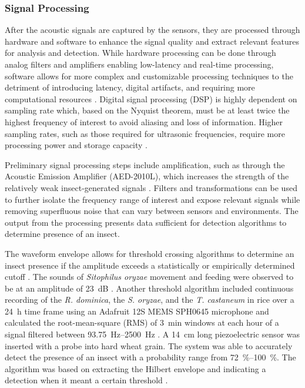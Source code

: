 \documentclass[../Vibro-Acoustic Signatures and Detection Algorithms for Stored Product Insects.tex]{subfiles}
\begin{document}
\newpage

\subsubsection{Signal Processing}

After the acoustic signals are captured by the sensors, they are processed through hardware and software to enhance the signal quality and extract relevant features for analysis and detection. While hardware processing can be done through analog filters and amplifiers enabling low-latency and real-time processing, software allows for more complex and customizable processing techniques to the detriment of introducing latency, digital artifacts, and requiring more computational resources \cite{mankinAutomatedApplicationsAcoustics2021}. Digital signal processing (DSP) is highly dependent on sampling rate which, based on the Nyquist theorem, must be at least twice the highest frequency of interest to avoid aliasing and loss of information. Higher sampling rates, such as those required for ultrasonic frequencies, require more processing power and storage capacity \cite{mankinPerspectivePromiseCentury2011}.

Preliminary signal processing steps include amplification, such as through the Acoustic Emission Amplifier (AED-2010L), which increases the strength of the relatively weak insect-generated signals \cite{eliopoulosEstimationPopulationDensity2016}. Filters and transformations can be used to further isolate the frequency range of interest and expose relevant signals while removing superfluous noise that can vary between sensors and environments. The output from the processing presents data sufficient for detection algorithms to determine presence of an insect.

The waveform envelope allows for threshold crossing algorithms to determine an insect presence if the amplitude exceeds a statistically or empirically determined cutoff \cite{mankinAutomatedApplicationsAcoustics2021}. The sounds of \textit{Sitophilus oryzae} movement and feeding were observed to be at an amplitude of \SI{23}{\deci\bel} \cite{mankinNoiseShieldingAcoustic1996}. Another threshold algorithm included continuous recording of the \textit{R. dominica}, the \textit{S. oryzae}, and the \textit{T. castaneum} in rice over a \SI{24}{\hour} time frame using an Adafruit 12S MEMS SPH0645 microphone and calculated the root-mean-square (RMS) of \SI{3}{\minute} windows at each hour of a signal filtered between \SIrange{93.75}{2500}{\hertz} \cite{balingbingDeterminingSoundSignatures2024}. A \SI{14}{\centi\meter} long piezoelectric sensor was inserted with a probe into hard wheat grain. The system was able to accurately detect the presence of an insect with a probability range from \SIrange{72}{100}{\percent}. The algorithm was based on extracting the Hilbert envelope and indicating a detection when it meant a certain threshold \cite{eliopoulosDetectionAdultBeetles2015}.
\end{document}
